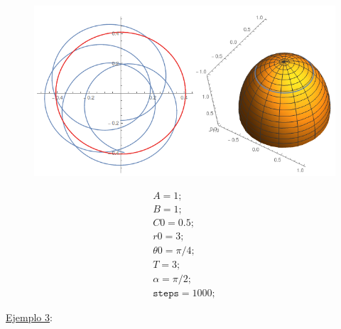 \documentclass[a4paper,10pt]{article}
\numberwithin{equation}{section}
\begin{document}
\begin{multicols}{2}

\begin{figure}[H]
\center
\includegraphics[scale=0.35]{problema5fig3}
\label{fig:problema5fig3}
\end{figure}

\begin{equation*}
\begin{aligned}
 A = 1; \\
 B = 1; \\
 C0 = 0.5; \\ 
 r0 = 3; \\
 \theta 0 = \pi/4; \\
 T = 3; \\
 \alpha = \pi/2; \\ 
 \texttt{steps} = 1000;
\end{aligned}
\end{equation*}

\end{multicols}

\underline{Ejemplo 3}:
\end{document}
